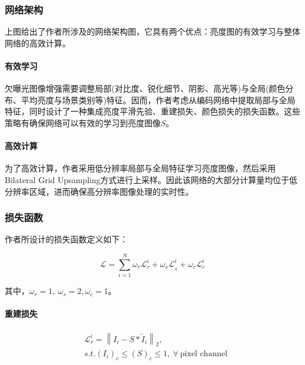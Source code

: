 \documentclass[letterpaper,12pt]{article}
\begin{document}
		\subsubsection{网络架构}
		
		上图给出了作者所涉及的网络架构图，它具有两个优点：亮度图的有效学习与整体网络的高效计算。
		
			\paragraph{有效学习} \qquad
			
			欠曝光图像增强需要调整局部(对比度、锐化细节、阴影、高光等)与全局(颜色分布、平均亮度与场景类别等)特征。因而，作者考虑从编码网络中提取局部与全局特征，同时设计了一种集成亮度平滑先验、重建损失、颜色损失的损失函数。这些策略有确保网络可以有效的学习到亮度图像$S$。
		
			\paragraph{高效计算} \qquad
			
			为了高效计算，作者采用低分辨率局部与全局特征学习亮度图像，然后采用Bilateral Grid Upsampling方式进行上采样。因此该网络的大部分计算量均位于低分辨率区域，进而确保高分辨率图像处理的实时性。
		
		\subsubsection{损失函数}
		
		作者所设计的损失函数定义如下：
		
		\begin{equation}\label{eq:Loss function 2019 } %
			\mathcal{L}=\sum_{i=1}^{N}{\omega_{r}\mathcal{L}_{r}^{i}}+{{\omega}_{s}\mathcal{L}}_{s}^{i}+{\omega}_{c}\mathcal{L}_{c}^{i}
		\end{equation}

		其中，$\omega_r=1,\ \omega_s=2,\omega_c=1$。
		
			\paragraph{重建损失} \qquad
			
			\begin{equation}\label{eq:Rebuilding loss} %
				\begin{aligned}
				&\mathcal{L}_{r}^{i}={\left \| I_i-S*\widetilde{I}_i \right \|}_2,\\ 
				&s.t.({I}_{i})_{c}\le({S})_{c}\le 1,\ \forall\ \text{pixel channel}
				\end{aligned}
			\end{equation}	
			
\end{document}
